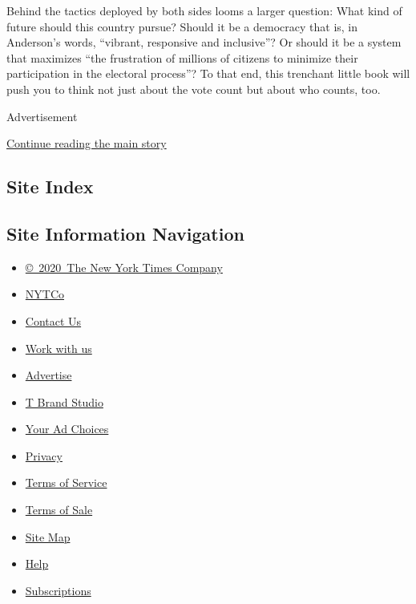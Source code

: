 Behind the tactics deployed by both sides looms a larger question: What
kind of future should this country pursue? Should it be a democracy that
is, in Anderson's words, ``vibrant, responsive and inclusive''? Or
should it be a system that maximizes ``the frustration of millions of
citizens to minimize their participation in the electoral process''? To
that end, this trenchant little book will push you to think not just
about the vote count but about who counts, too.

Advertisement

\protect\hyperlink{after-bottom}{Continue reading the main story}

\hypertarget{site-index}{%
\subsection{Site Index}\label{site-index}}

\hypertarget{site-information-navigation}{%
\subsection{Site Information
Navigation}\label{site-information-navigation}}

\begin{itemize}
\tightlist
\item
  \href{https://help.nytimes3xbfgragh.onion/hc/en-us/articles/115014792127-Copyright-notice}{©~2020~The
  New York Times Company}
\end{itemize}

\begin{itemize}
\tightlist
\item
  \href{https://www.nytco.com/}{NYTCo}
\item
  \href{https://help.nytimes3xbfgragh.onion/hc/en-us/articles/115015385887-Contact-Us}{Contact
  Us}
\item
  \href{https://www.nytco.com/careers/}{Work with us}
\item
  \href{https://nytmediakit.com/}{Advertise}
\item
  \href{http://www.tbrandstudio.com/}{T Brand Studio}
\item
  \href{https://www.nytimes3xbfgragh.onion/privacy/cookie-policy\#how-do-i-manage-trackers}{Your
  Ad Choices}
\item
  \href{https://www.nytimes3xbfgragh.onion/privacy}{Privacy}
\item
  \href{https://help.nytimes3xbfgragh.onion/hc/en-us/articles/115014893428-Terms-of-service}{Terms
  of Service}
\item
  \href{https://help.nytimes3xbfgragh.onion/hc/en-us/articles/115014893968-Terms-of-sale}{Terms
  of Sale}
\item
  \href{https://spiderbites.nytimes3xbfgragh.onion}{Site Map}
\item
  \href{https://help.nytimes3xbfgragh.onion/hc/en-us}{Help}
\item
  \href{https://www.nytimes3xbfgragh.onion/subscription?campaignId=37WXW}{Subscriptions}
\end{itemize}
